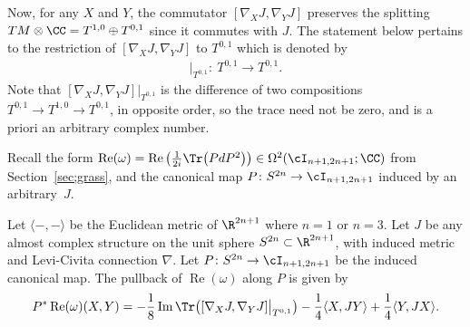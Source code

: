  Now, for any $X$ and $Y$, the commutator $[\nabla_X J, \nabla_Y J]$ preserves the splitting $TM \otimes \CC = T^{1,0} \oplus T^{0,1}$ since it commutes with $J$. The statement below pertains to the restriction of $[\nabla_X J, \nabla_Y J]$ to $T^{0,1}$ which is denoted by
 \begin{gather*}
[ \nabla_X J , \nabla_Y J ] \big|_{T^{0,1}} \colon \ T^{0,1} \to T^{0,1}.
 \end{gather*}
 Note that $ [ \nabla_X J , \nabla_Y J ] \big|_{T^{0,1}}$ is the difference of two compositions $T^{0,1} \to T^{1,0} \to T^{0,1}$, in opposite order, so the trace need not be zero, and is a priori an arbitrary complex number.

Recall the form $\operatorname{Re}(\omega) = \operatorname{Re}\big( \frac{1}{ 2i} \Tr\big(PdP^2\big) \big) \in \Omega^2(\cI_{n+1,2n+1};\CC)$ from Section~\ref{sec;grass}, and the cano\-ni\-cal map $P\colon S^{2n} \to \cI_{n+1,2n+1}$ induced by an arbitrary~$J$.

\begin{thm} \label{thm;Pcanon}
Let $\langle -,- \rangle $ be the Euclidean metric of $\R^{2n+1}$ where $n=1$ or $n=3$. Let $J$ be any almost complex structure on the unit sphere $S^{2n} \subset \R^{2n+1}$, with induced metric and Levi-Civita connection $\nabla$. Let $P\colon S^{2n} \to \cI_{n+1,2n+1}$ be the induced canonical map. The pullback of $\operatorname{Re}(\omega)$ along $P$ is given by
\begin{gather*}
 P^* \operatorname{Re} ( \omega) (X,Y) =-\frac{1}{8} \operatorname{Im} \Tr \big([ \nabla_X J , \nabla_Y J ] \big|_{T^{0,1}} \big)
 - \frac 1 4 \langle X,JY \rangle + \frac 1 4 \langle Y,JX \rangle .
\end{gather*}
\end{thm}

